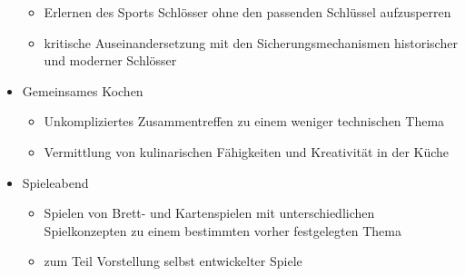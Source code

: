 \documentclass[10pt, a4paper]{scrartcl}
\begin{document}
\begin{itemize}
		\begin{itemize}
		    \item Erlernen des Sports Schlösser ohne den passenden Schlüssel aufzusperren
		    \item kritische Auseinandersetzung mit den Sicherungsmechanismen historischer und moderner Schlösser
		\end{itemize}
	\item Gemeinsames Kochen
		\begin{itemize}
			\item Unkompliziertes Zusammentreffen zu einem weniger technischen Thema
			\item Vermittlung von kulinarischen Fähigkeiten und Kreativität in der Küche
		\end{itemize}
	\item Spieleabend
		\begin{itemize}
			\item Spielen von Brett- und Kartenspielen mit unterschiedlichen Spielkonzepten zu einem bestimmten vorher festgelegten Thema
			\item zum Teil Vorstellung selbst entwickelter Spiele
		\end{itemize}
\end{itemize}
\end{document}
